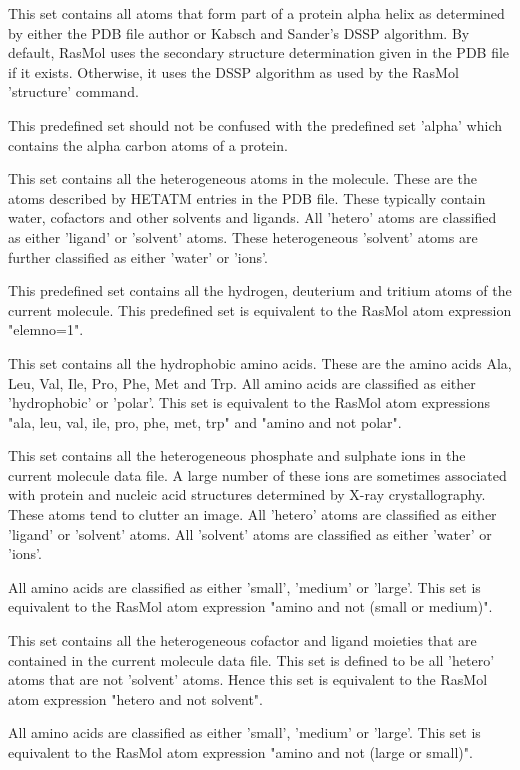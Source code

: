 This set contains all atoms that form part of a protein alpha
helix as determined by either the PDB file author or Kabsch and
Sander's DSSP algorithm. By default, RasMol uses the secondary
structure determination given in the PDB file if it exists.
Otherwise, it uses the DSSP algorithm as used by the RasMol
'structure'
command.

This predefined set should not be confused with the predefined set
'alpha'
which contains the alpha carbon atoms of a protein.

This set contains all the heterogeneous atoms in the molecule. These
are the atoms described by HETATM entries in the PDB file. These
typically contain water, cofactors and other solvents and ligands. All
'hetero'
atoms are classified as either
'ligand'
or
'solvent'
atoms. These heterogeneous
'solvent'
atoms are further classified as either
'water'
or
'ions'.

This predefined set contains all the hydrogen, deuterium and tritium atoms
of the current molecule. This predefined set is equivalent to the
RasMol atom expression
"elemno=1".

This set contains all the hydrophobic amino acids.
These are the amino acids Ala, Leu, Val, Ile, Pro, Phe, Met and Trp.
All amino acids are classified as either
'hydrophobic'
or
'polar'.
This set is equivalent to the RasMol atom expressions
"ala, leu, val, ile, pro, phe, met, trp"
and
"amino and not polar".

This set contains all the heterogeneous phosphate and sulphate ions in
the current molecule data file. A large number of these ions are
sometimes associated with protein and nucleic acid structures determined
by X-ray crystallography. These atoms tend to clutter an image. All
'hetero'
atoms are classified as either
'ligand'
or
'solvent'
atoms. All
'solvent'
atoms are classified as either
'water'
or
'ions'.

All amino acids are classified as either
'small',
'medium'
or
'large'.
This set is equivalent to the RasMol atom expression
"amino and not (small or medium)".

This set contains all the heterogeneous cofactor and ligand moieties that
are contained in the current molecule data file.  This set is defined
to be all
'hetero'
atoms that are not
'solvent'
atoms. Hence this set is equivalent to the RasMol atom expression
"hetero and not solvent".

All amino acids are classified as either
'small',
'medium'
or
'large'.
This set is equivalent to the RasMol atom expression
"amino and not (large or small)".

